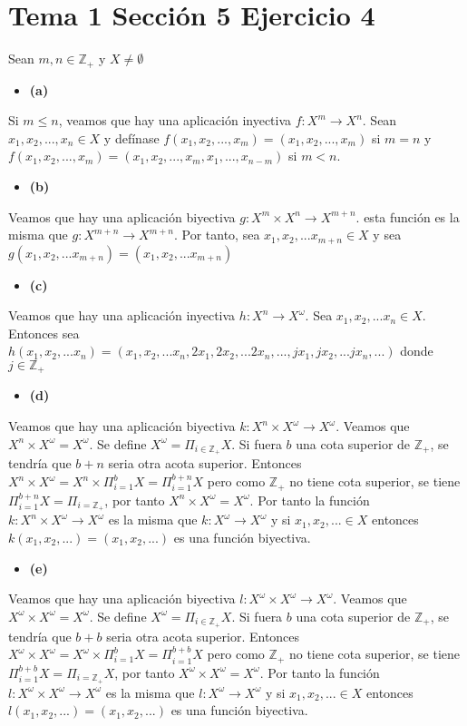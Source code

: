 \documentclass{article}
\begin{document}
\section{Tema 1 Sección 5 Ejercicio 4}
Sean $m,n\in\mathbb{Z}_{+}$ y $X\neq \emptyset$
\begin{itemize}
\item \bf (a) \rm
\end{itemize}
Si $m\leq n$, veamos que hay una aplicación inyectiva $f:X^{m}\rightarrow X^{n}$. Sean $x_1,x_2,...,x_n\in X$ y defínase $f(x_1, x_2,...,x_m)=(x_1, x_2,...,x_m)$ si $m=n$ y $f(x_1, x_2,...,x_m)=(x_1, x_2,...,x_m,x_1,...,x_{n-m})$ si $m<n$.
\begin{itemize}
\item \bf (b) \rm
\end{itemize}
Veamos que hay una aplicación biyectiva $g:X^{m}\times X^{n}\rightarrow X^{m+n}$. esta función es la misma que $g:X^{m+n}\rightarrow X^{m+n}$. Por tanto, sea $x_1,x_2,...x_{m+n}\in X$ y sea $g(x_1,x_2,...x_{m+n})=(x_1,x_2,...x_{m+n})$
\begin{itemize}
\item \bf (c) \rm
\end{itemize}
Veamos que hay una aplicación inyectiva $h:X^{n}\rightarrow X^{\omega}$. Sea $x_1,x_2,...x_{n}\in X$. Entonces sea $h(x_1,x_2,...x_{n})=(x_1,x_2,...x_{n},2x_1,2x_2,...2x_{n},...,jx_1,jx_2,...jx_{n},...)$ donde $j\in\mathbb{Z}_{+}$
\begin{itemize}
\item \bf (d) \rm
\end{itemize}
Veamos que hay una aplicación biyectiva $k:X^{n}\times X^{\omega}\rightarrow X^{\omega}$. Veamos que $X^{n}\times X^{\omega}=X^{\omega}$. Se define $X^{\omega}=\Pi_{i\in \mathbb{Z}_{+}}X$. Si fuera $b$ una cota superior de $\mathbb{Z}_{+}$, se tendría que $b+n$ seria otra acota superior. Entonces $X^{n}\times X^{\omega}=X^{n}\times \Pi^b_{i=1}X=\Pi^{b+n}_{i=1}X$ pero como $\mathbb{Z}_{+}$ no tiene cota superior, se tiene  $\Pi^{b+n}_{i=1}X=\Pi_{i=\mathbb{Z}_{+}}$, por tanto $X^{n}\times X^{\omega}=X^{\omega}$. Por tanto la función $k:X^{n}\times X^{\omega}\rightarrow X^{\omega}$ es la misma que $k:X^{\omega}\rightarrow X^{\omega}$ y si $x_1,x_2,...\in X$ entonces  $k(x_1,x_2,...)=(x_1,x_2,...)$ es una función biyectiva.
\begin{itemize}
\item \bf (e) \rm
\end{itemize}
Veamos que hay una aplicación biyectiva $l:X^{\omega}\times X^{\omega}\rightarrow X^{\omega}$. Veamos que $X^{\omega}\times X^{\omega}=X^{\omega}$. Se define $X^{\omega}=\Pi_{i\in \mathbb{Z}_{+}}X$. Si fuera $b$ una cota superior de $\mathbb{Z}_{+}$, se tendría que $b+b$ seria otra acota superior. Entonces $X^{\omega}\times X^{\omega}=X^{\omega}\times \Pi^b_{i=1}X=\Pi^{b+b}_{i=1}X$ pero como $\mathbb{Z}_{+}$ no tiene cota superior, se tiene  $\Pi^{b+b}_{i=1}X=\Pi_{i=\mathbb{Z}_{+}}X$, por tanto $X^{\omega}\times X^{\omega}=X^{\omega}$. Por tanto la función $l:X^{\omega}\times X^{\omega}\rightarrow X^{\omega}$ es la misma que $l:X^{\omega}\rightarrow X^{\omega}$ y si $x_1,x_2,...\in X$ entonces  $l(x_1,x_2,...)=(x_1,x_2,...)$ es una función biyectiva.
\end{document}
